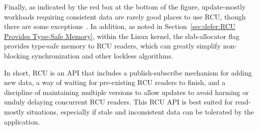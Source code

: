 Finally, as indicated by the red box at the bottom of the figure,
update-mostly workloads requiring
consistent data are rarely good places to use RCU, though there are some
exceptions~\cite{MathieuDesnoyers2012URCU}.
In addition, as noted in
Section~\ref{sec:defer:RCU Provides Type-Safe Memory},
within the Linux kernel, the 
slab-allocator flag provides type-safe memory to RCU readers, which can
greatly simplify non-blocking synchronization and other lockless
algorithms.

In short, RCU is an API that includes a publish-subscribe mechanism for
adding new data, a way of waiting for pre-existing RCU readers to finish,
and a discipline of maintaining multiple versions to allow updates to
avoid harming or unduly delaying concurrent RCU readers.
This RCU API is best suited for read-mostly situations, especially if
stale and inconsistent data can be tolerated by the application.
